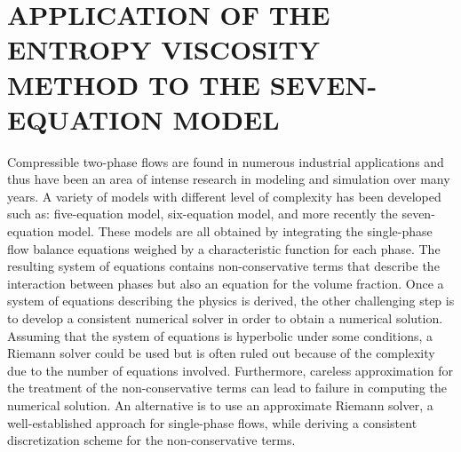 %
%
%


\chapter{\uppercase {Application of the entropy viscosity method to the seven-equation model}}\label{chap:seven}
%
Compressible two-phase flows are found in numerous industrial applications and thus have been an area of intense research in modeling and simulation over many years. A variety of models with different level of complexity has been developed such as: five-equation model, six-equation model, and more recently the seven-equation model. These models are all obtained by integrating the single-phase flow balance equations weighed by a characteristic function for each phase. The resulting system of equations contains non-conservative terms that describe the interaction between phases but also an equation for the volume fraction. Once a system of equations describing the physics is derived, the other challenging step is to develop a consistent numerical solver in order to obtain a numerical solution. Assuming that the system of equations is hyperbolic under some conditions, a Riemann solver could be used but is often ruled out because of the complexity due to the number of equations involved. Furthermore, careless approximation for the treatment of the non-conservative terms can lead to failure in computing the numerical solution. An alternative is to use an approximate Riemann solver, a well-established approach for single-phase flows, while deriving a consistent discretization scheme for the non-conservative terms. 

